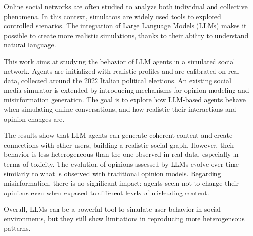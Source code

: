 Online social networks are often studied to analyze both individual and collective phenomena. 
In this context, simulators are widely used tools to explored controlled scenarios. 
The integration of Large Language Models (LLMs) makes it possible to create more realistic simulations, thanks to their ability to understand natural language.

This work aims at studying the behavior of LLM agents in a simulated social network.
Agents are initialized with realistic profiles and are calibrated on real data, collected around the 2022 Italian political elections.
An existing social media simulator is extended by introducing mechanisms for opinion modeling and misinformation generation.
The goal is to explore how LLM-based agents behave when simulating online conversations, and how realistic their interactions and opinion changes are.

The results show that LLM agents can generate coherent content and create connections with other users, building a realistic social graph.
However, their behavior is less heterogeneous than the one observed in real data, especially in terms of toxicity.
The evolution of opinions assessed by LLMs evolve over time similarly to what is observed with traditional opinion models.
Regarding misinformation, there is no significant impact: agents seem not to change their opinions even when exposed to different levels of misleading content.

Overall, LLMs can be a powerful tool to simulate user behavior in social environments, but they still show limitations in reproducing more heterogeneous patterns.